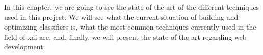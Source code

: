 In this chapter, we are going to see the state of the art of the different techniques used in this project. We will see what the current situation of building and optimizing classifiers is, what the most common techniques currently used in the field of \ac{xai} are, and, finally, we will present the state of the art regarding web development.